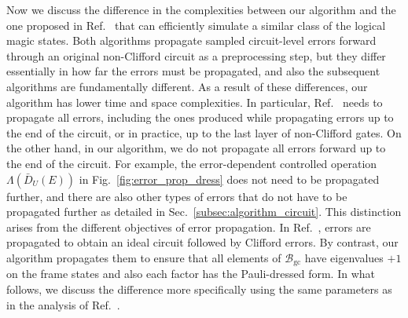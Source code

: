 \documentclass[
 reprint,
 amsmath,amssymb,
 pra,superscriptaddress, nofootinbib
]{revtex4-2}
\theoremstyle{definition}
\theoremstyle{plain}
\begin{document}
Now we discuss the difference in the complexities between our algorithm and the one proposed in Ref.~\cite{fby6-xjbm} that can efficiently simulate a similar class of the logical magic states.
Both algorithms propagate sampled circuit-level errors forward through an original non-Clifford circuit as a preprocessing step, but they differ essentially in how far the errors must be propagated, and also the subsequent algorithms are fundamentally different. 
As a result of these differences, our algorithm has lower time and space complexities.
In particular, Ref.~\cite{fby6-xjbm} needs to propagate all errors, including the ones produced while propagating errors up to the end of the circuit, or in practice, up to the last layer of non-Clifford gates.
On the other hand, in our algorithm, we do not propagate all errors forward up to the end of the circuit. For example, the error-dependent controlled operation $\Lambda(\bar{D}_U(E))$ in Fig.~\ref{fig:error_prop_dress} does not need to be propagated further, and there are also other types of errors that do not have to be propagated further as detailed in Sec.~\ref{subsec:algorithm_circuit}. 
This distinction arises from the different objectives of error propagation. In Ref.~\cite{fby6-xjbm}, errors are propagated to obtain an ideal circuit followed by Clifford errors. By contrast, our algorithm propagates them to ensure that all elements of $\mathcal{B}_{\mathrm{gc}}$ have eigenvalues $+1$ on the frame states and also each factor has the Pauli-dressed form.
In what follows, we discuss the difference more specifically using the same parameters as in the analysis of Ref.~\cite{fby6-xjbm}.
\end{document}
